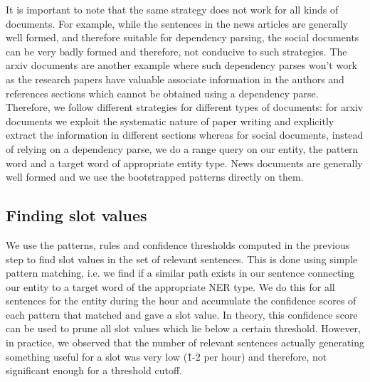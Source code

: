\begin{itemize}[label={}]
It is important to note that the same strategy does not work for all kinds of documents. For example, while the sentences in the news articles are generally well formed, and therefore suitable for dependency parsing, the social documents can be very badly formed and therefore, not conducive to such strategies. The arxiv documents are another example where such dependency parses won’t work as the research papers have valuable associate information in the authors and references sections which cannot be obtained using a dependency parse. Therefore, we follow different strategies for different types of documents: for arxiv documents we exploit the systematic nature of paper writing and explicitly extract the information in different sections whereas for social documents, instead of relying on a dependency parse, we do a range query on our entity, the pattern word and a target word of appropriate entity type. News documents are generally well formed and we use the bootstrapped patterns directly on them.
\end{itemize}

\subsection{Finding slot values}
We use the patterns, rules and confidence thresholds computed in the previous step to find slot values in the set of relevant sentences. This is done using simple pattern matching, i.e. we find if a similar path exists in our sentence connecting our entity to a target word of the appropriate NER type. We do this for all sentences for the entity during the hour and accumulate the confidence scores of each pattern that matched and gave a slot value. In theory, this confidence score can be used to prune all slot values which lie below a certain threshold. However, in practice, we observed that the number of relevant sentences actually generating something useful for a slot was very low (\~1-2 per hour) and therefore, not significant enough for a threshold cutoff.

